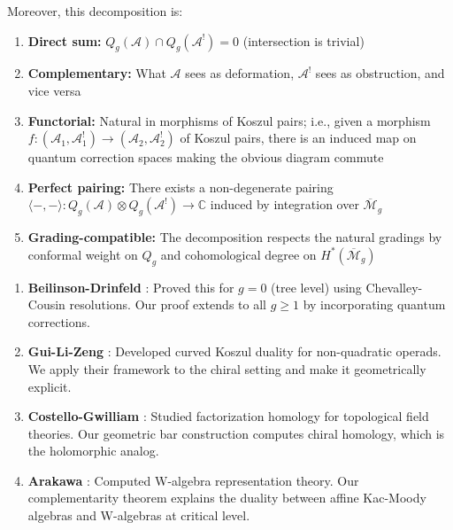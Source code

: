 \begin{theorem}
Moreover, this decomposition is:
\begin{enumerate}
\item \textbf{Direct sum:} $Q_g(\mathcal{A}) \cap Q_g(\mathcal{A}^!) = 0$ 
(intersection is trivial)
\item \textbf{Complementary:} What $\mathcal{A}$ sees as deformation, $\mathcal{A}^!$ 
sees as obstruction, and vice versa
\item \textbf{Functorial:} Natural in morphisms of Koszul pairs; i.e., given a 
morphism $f: (\mathcal{A}_1, \mathcal{A}_1^!) \to (\mathcal{A}_2, \mathcal{A}_2^!)$ 
of Koszul pairs, there is an induced map on quantum correction spaces making the 
obvious diagram commute
\item \textbf{Perfect pairing:} There exists a non-degenerate pairing 
$\langle -, - \rangle: Q_g(\mathcal{A}) \otimes Q_g(\mathcal{A}^!) \to \mathbb{C}$ 
induced by integration over $\overline{\mathcal{M}}_g$
\item \textbf{Grading-compatible:} The decomposition respects the natural gradings 
by conformal weight on $Q_g$ and cohomological degree on $H^*(\overline{\mathcal{M}}_g)$
\end{enumerate}
\end{theorem}

\begin{remark}
\begin{enumerate}
\item \textbf{Beilinson-Drinfeld} \cite[Chapter 4]{BD04}: Proved this for $g=0$ 
(tree level) using Chevalley-Cousin resolutions. Our proof extends to all $g \geq 1$ 
by incorporating quantum corrections.

\item \textbf{Gui-Li-Zeng} \cite{GLZ22}: Developed curved Koszul duality for 
non-quadratic operads. We apply their framework to the chiral setting and make it 
geometrically explicit.

\item \textbf{Costello-Gwilliam} \cite{CG17}: Studied factorization homology for 
topological field theories. Our geometric bar construction computes chiral homology, 
which is the holomorphic analog.

\item \textbf{Arakawa} \cite{Ara12}: Computed W-algebra representation theory. Our 
complementarity theorem explains the duality between affine Kac-Moody algebras and 
W-algebras at critical level.
\end{enumerate}
\end{remark}

